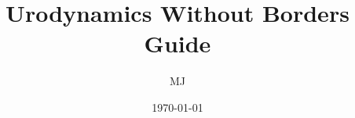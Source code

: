 \documentclass{article}
\begin{document}
\title{Urodynamics Without Borders Guide}
\author{MJ}
\date{\today}
\maketitle

\tableofcontents


\end{document}
